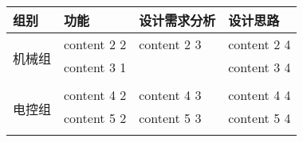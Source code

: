 
\begin{longtable}{ X | X | X | X |}

    \hline

    \endfoot
    
    \rowcolor{tabhdcolor}

        组别 &
        功能 &
        设计需求分析 &
        设计思路\\

    \hline

    \endhead

        \multirow{3}{*}{机械组} &
        content 2 2 &
        content 2 3 &
        content 2 4\\
        
        &
        content 3 1 &
        &
        content 3 4 \\

        &
        &
        &
        \\
        
    \hline
    
        \multirow{3}{*}{电控组} &
        content 4 2 &
        content 4 3 &
        content 4 4 \\

    
        &
        content 5 2 &
        content 5 3 &
        content 5 4 \\

        &
        &
        &
        \\
        
    \hline
    

\end{longtable}
